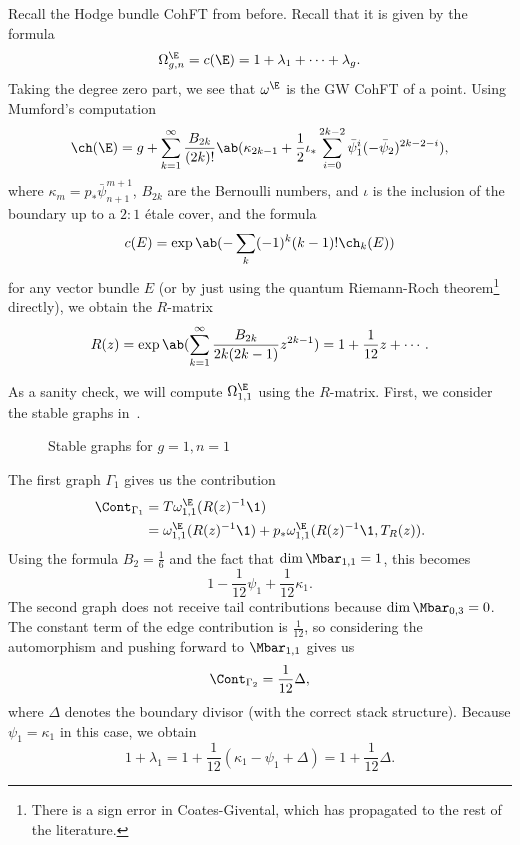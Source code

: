 \begin{exm}
    Recall the Hodge bundle CohFT from before. Recall that it is given by the formula
    \[ \Omega^{\E}_{g,n} = c(\E) = 1 + \lambda_1 + \cdots + \lambda_g. \]
    Taking the degree zero part, we see that $\omega^{\E}$ is the GW CohFT of a point. Using Mumford's computation
    \[ \ch(\E) = g + \sum_{k=1}^{\infty} \frac{B_{2k}}{(2k)!}\ab(\kappa_{2k-1} + \frac{1}{2}\iota_*\sum_{i=0}^{2k-2} \bar{\psi}_1^{i} (-\bar{\psi}_2)^{2k-2-i}), \]
    where $\kappa_{m} = p_* \bar{\psi}_{n+1}^{m+1}$, $B_{2k}$ are the Bernoulli numbers, and $\iota$ is the inclusion of the boundary up to a $2:1$ \'etale cover, and the formula
    \[ c(E) = \exp \ab(-\sum_k (-1)^k (k-1)!\ch_k(E)) \]
    for any vector bundle $E$ (or by just using the quantum Riemann-Roch theorem\footnote{There is a sign error in Coates-Givental, which has propagated to the rest of the literature.} directly), we obtain the $R$-matrix
    \[ R(z) = \exp\ab( \sum_{k=1}^{\infty} \frac{B_{2k}}{2k(2k-1)} z^{2k-1}) = 1+\frac{1}{12}z + \cdots. \]

    As a sanity check, we will compute $\Omega_{1,1}^{\E}$ using the $R$-matrix. First, we consider the stable graphs in~.
    \begin{figure}[htpb]
    \begin{center}
    \end{center}
    \caption{Stable graphs for $g=1, n=1$}%
    \label{fig:03graphloop}
    \end{figure}
    The first graph $\Gamma_1$ gives us the contribution
    \begin{align*}
        \Cont_{\Gamma_1} &= T\omega_{1,1}^{\E}(R(z)^{-1}\1) \\
        &= \omega_{1,1}^{\E}(R(z)^{-1}\1) + p_* \omega_{1,1}^{\E}(R(z)^{-1}\1, T_R(z)).
    \end{align*}
    Using the formula $B_2 = \frac{1}{6}$ and the fact that $\dim \Mbar_{1,1} = 1$, this becomes
    \[ 1 - \frac{1}{12}\psi_1 + \frac{1}{12} \kappa_1. \]
    The second graph does not receive tail contributions because $\dim \Mbar_{0,3} = 0$. The constant term of the edge contribution is $\frac{1}{12}$, so considering the automorphism and pushing forward to $\Mbar_{1,1}$ gives us
    \[ \Cont_{\Gamma_2} = \frac{1}{12} \Delta, \]
    where $\Delta$ denotes the boundary divisor (with the correct stack structure). Because $\psi_1 = \kappa_1$ in this case, we obtain
    \[ 1+\lambda_1 = 1 + \frac{1}{12}(\kappa_1 - \psi_1 + \Delta) = 1 + \frac{1}{12} \Delta. \]
\end{exm}




